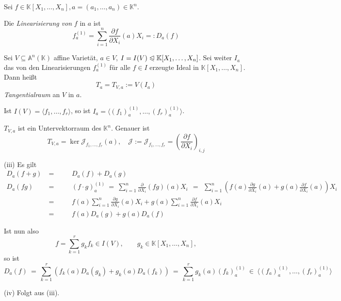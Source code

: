 \documentclass[11pt]{book}
\theoremstyle{nonumberbreak}
\newenvironment{pr}[1][]{\ifthenelse{\equal{#1}{}}{\proof}{\proof[#1]}\rm}{\endproof}
\newenvironment{definbem}[1][]{\ifthenelse{\equal{#1}{}}{\definibem}{\definibem[#1]}\rm}{\enddefinibem}
\begin{document}
\begin{spacing}{1.3}
\begin{definbem}
Sei $f \in \mathbb{K}[X_1, \ldots, X_n], a= (a_1, \ldots, a_n) \in \mathbb{K}^n$.
\begin{compactenum}
\item Die \textit{Linearisierung von } $f$ in $a$ ist
$$f_a^{(1)} = \sum_{i=1}^n \frac{\partial f}{\partial X_i} (a) X_i =: D_a(f)$$
\item Sei $V \subseteq \mathbb{A}^n(\mathbb{K})$ affine Varietät, $a \in V$, $I=I(V) \trianglelefteqslant \mathbb{K}[X_1, \ldots, X_n]$. Sei weiter $I_a$ das von den Linearisierungen $f_a^{(1)}$ für alle $f \in I$ erzeugte Ideal in $\mathbb{K}[X_1, \ldots, X_n]$. Dann heißt
$$T_a = T_{V,a} := V(I_a)$$
\textit{Tangentialraum} an $V$ in $a$.
\item Ist $I(V)=\langle f_1, \ldots, f_r \rangle$, so ist $I_a = \langle (f_1)_a^{(1)}, \ldots, (f_r)_a^{(1)} \rangle$.
\item $T_{V,a}$ ist ein Untervektorraum des $\mathbb{K}^n$. Genauer ist 
$$T_{V,a} = \ker \mathcal{J}_{f_1, \ldots, f_r} (a), \quad \mathcal{J}:= \mathcal{J}_{f_1, \ldots, f_r} = \left( \frac{\partial f}{\partial X_i} \right)_{i,j}$$
\end{compactenum}
\begin{pr}
\begin{compactenum}
\item[(iii)] Es gilt\\[-48pt]

\begin{alignat*}{5}  D_a(f+g)\ & = &&\quad D_a(f) + D_a(g) \\
D_a(fg)\ & = &&\quad (f \cdot g)_a^{(1)} \ =\ \sum_{i=1}^n \frac{\partial}{\partial X_i} (fg) (a) X_i 
\ \ = \ \ \sum_{i=1}^n \left( f(a) \frac{\partial g}{\partial X_i} (a) + g(a) \frac{\partial f}{\partial X_i}(a) \right) X_i\\
&=&& \quad f(a) \sum_{i=1}^n \frac{\partial g}{\partial X_i} (a) X_i + g(a) \sum_{i=1}^n \frac{\partial f}{\partial X_i} (a) X_i\\
&=&& \quad f(a) D_a(g) + g(a) D_a(f)
\end{alignat*}

Ist nun also 
$$f = \sum_{k=1}^r g_k f_k \in I(V), \qquad g_k \in \mathbb{K}[X_1, \ldots, X_n],$$
so ist
$$D_a(f) \ = \ \sum_{k=1}^r \left(f_k(a) D_a(g_k) + g_k(a) D_a(f_k) \right) \ = \ \sum_{k=1}^r g_k(a) (f_k)_a^{(1)} \ \in \ \langle (f_a)_a^{(1)}, \ldots, (f_r)_a^{(1)} \rangle $$

\item[(iv)] Folgt aus (iii).
\end{compactenum}
\end{pr}
\end{definbem}


\end{spacing}
\end{document}
